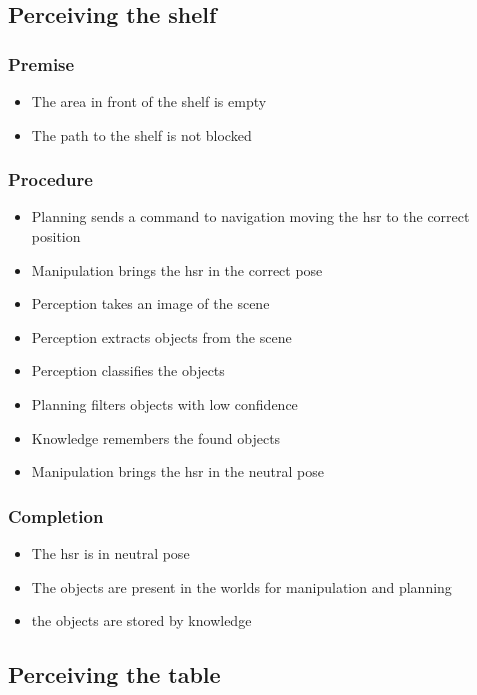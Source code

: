 \documentclass[main.tex]{subfiles}
\begin{document}
	\subsection{Perceiving the shelf}
	
	\subsubsection{Premise}
	\begin{itemize}
		\item The area in front of the shelf is empty 
		\item The path to the shelf is not blocked
	\end{itemize} 
	
	\subsubsection{Procedure}
	\begin{itemize}			
		\item Planning sends a command to navigation moving the hsr to the correct position
		\item Manipulation brings the hsr in the correct pose
		\item Perception takes an image of the scene
		\item Perception extracts objects from the scene
		\item Perception classifies the objects	
		\item Planning filters objects with low confidence
		\item Knowledge remembers the found objects
		\item Manipulation brings the hsr in the neutral pose	 				
	\end{itemize}
	
	\subsubsection{Completion}
	\begin{itemize}
		\item The hsr is in neutral pose
		\item The objects are present in the worlds for manipulation and planning
		\item the objects are stored by knowledge				
	\end{itemize}
	
	\subsection{Perceiving the table}
	
\end{document}
